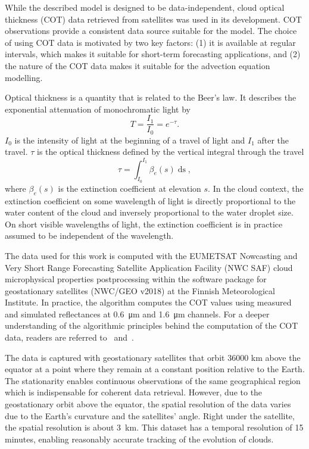 While the described model is designed to be data-independent, cloud optical thickness (COT) data retrieved from satellites was used in its development.
COT observations provide a consistent data source suitable for the model.
The choice of using COT data is motivated by two key factors: (1) it is available at regular intervals, which makes it suitable for short-term forecasting applications, and (2) the nature of the COT data makes it suitable for the advection equation modelling.

Optical thickness is a quantity that is related to the Beer's law.
It describes the exponential attenuation of monochromatic light by
\begin{equation*}
    T = \frac{I_1}{I_0} = e^{-\tau}.
\end{equation*}
$I_0$ is the intensity of light at the beginning of a travel of light and $I_1$ after the travel.
$\tau$ is the optical thickness defined by the vertical integral through the travel
\begin{equation*}
    \tau = \int_{I_0}^{I_1} \beta_e(s) \mathop{ds},
\end{equation*}
where $\beta_e(s)$ is the extinction coefficient at elevation $s$.
In the cloud context, the extinction coefficient on some wavelength of light is directly proportional to the water content of the cloud and inversely proportional to the water droplet size.
On short visible wavelengths of light, the extinction coefficient is in practice assumed to be independent of the wavelength.

The data used for this work is computed with the EUMETSAT Nowcasting and Very Short Range Forecasting Satellite Application Facility (NWC SAF) cloud microphysical properties postprocessing within the software package for geostationary satellites (NWC/GEO v2018) at the Finnish Meteorological Institute.
In practice, the algorithm computes the COT values using measured and simulated reflectances at \SI{0.6}{\micro\metre} and \SI{1.6}{\micro\metre} channels.
For a deeper understanding of the algorithmic principles behind the computation of the COT data, readers are referred to~\cite{nwcsaf} and~\cite{cot}.

The data is captured with geostationary satellites that orbit 36000 km above the equator at a point where they remain at a constant position relative to the Earth.
The stationarity enables continuous observations of the same geographical region which is indispensable for coherent data retrieval.
However, due to the geostationary orbit above the equator, the spatial resolution of the data varies due to the Earth's curvature and the satellites' angle.
Right under the satellite, the spatial resolution is about \SI{3}{\kilo\metre}.
This dataset has a temporal resolution of 15 minutes, enabling reasonably accurate tracking of the evolution of clouds.

